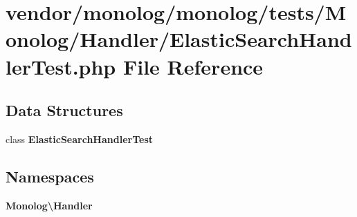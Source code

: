 \section{vendor/monolog/monolog/tests/\+Monolog/\+Handler/\+Elastic\+Search\+Handler\+Test.php File Reference}
\label{_elastic_search_handler_test_8php}
\subsection*{Data Structures}
\begin{DoxyCompactItemize}
\item 
class {\bf Elastic\+Search\+Handler\+Test}
\end{DoxyCompactItemize}
\subsection*{Namespaces}
\begin{DoxyCompactItemize}
\item 
 {\bf Monolog\textbackslash{}\+Handler}
\end{DoxyCompactItemize}
